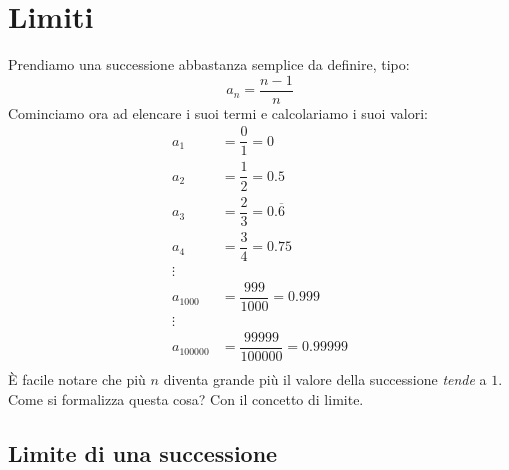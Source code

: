 \section{Limiti} \label{limiti}
Prendiamo una successione abbastanza semplice da definire, tipo:
\begin{equation*}
    a_n = \frac{n-1}{n}
\end{equation*}
Cominciamo ora ad elencare i suoi termi e calcolariamo i suoi valori:
\begin{align*}
    a_1 &= \dfrac{0}{1} = 0\\
    a_2 &= \dfrac{1}{2} = 0.5\\
    a_3 &= \dfrac{2}{3} = 0.\overline{6}\\
    a_4 &= \dfrac{3}{4} = 0.75\\
    \vdots\\
    a_{1000} &= \dfrac{999}{1000} = 0.999\\
    \vdots\\
    a_{100000} &= \dfrac{99999}{100000} = 0.99999\\
\end{align*}
È facile notare che più $n$ diventa grande più il valore della successione \textit{tende} a $1$. Come si formalizza questa cosa? Con il concetto di limite.

\subsection{Limite di una successione} \label{lim_successioni}

